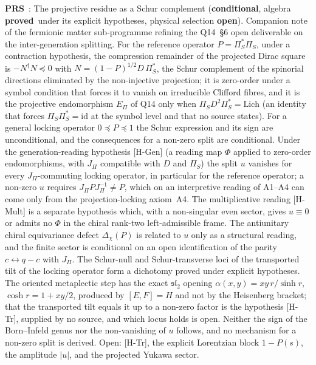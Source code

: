\documentclass[11pt,a4paper]{article}
\newcommand{\sproved}{\textcolor{cproved}{\textbf{proved}}}
\newcommand{\sopen}{\textcolor{copen}{\textbf{open}}}
\newcommand{\scond}{\textcolor{ccond}{\textbf{conditional}}}
\begin{document}
    \textbf{PRS}~\cite{Beau2026prs}: The projective residue as a Schur complement (\scond, algebra \sproved\ under its
    explicit hypotheses, physical selection \sopen).
    Companion note of the fermionic matter sub-programme refining the Q14~\S6 open deliverable on
    the inter-generation splitting.
    For the reference operator $P = \Pi_S^*\Pi_S$, under a contraction hypothesis, the compression remainder of the
    projected Dirac square is $-N^\dagger N \preceq 0$ with $N = (1-P)^{1/2} D\,\Pi_S^*$, the Schur complement of the
    spinorial directions eliminated by the non-injective projection; it is zero-order under a symbol condition that
    forces it to vanish on irreducible Clifford fibres, and it is the projective endomorphism $E_\Pi$ of Q14 only when
    $\Pi_S D^2 \Pi_S^* = \mathrm{Lich}$ (an identity that forces $\Pi_S \Pi_S^* = \mathrm{id}$ at the symbol level and
    that no source states).
    For a general locking operator $0 \preceq P \preceq 1$ the Schur expression and its sign are unconditional, and the
    consequences for a non-zero split are conditional.
    Under the generation-reading hypothesis [H-Gen] (a reading map $\Phi$ applied to zero-order endomorphisms, with
    $J_\Pi$ compatible with $D$ and $\Pi_S$) the split $u$ vanishes for every $J_\Pi$-commuting locking operator, in
    particular for the reference operator; a non-zero $u$ requires $J_\Pi P J_\Pi^{-1} \neq P$, which on an
    interpretive reading of A1--A4 can come only from the projection-locking axiom~A4.
    The multiplicative reading [H-Mult] is a separate hypothesis which, with a non-singular even sector, gives
    $u \equiv 0$ or admits no $\Phi$ in the chiral rank-two left-admissible frame.
    The antiunitary chiral equivariance defect $\Delta_\chi(P)$ is related to $u$ only as a structural reading, and the
    finite sector is conditional on an open identification of the parity $c \leftrightarrow q-c$ with $J_\Pi$.
    The Schur-null and Schur-transverse loci of the transported tilt of the locking operator form a dichotomy proved
    under explicit hypotheses.
    The oriented metaplectic step has the exact $\mathfrak{sl}_2$ opening $\alpha(x,y) = xy\,r/\sinh r$,
    $\cosh r = 1 + xy/2$, produced by $[E,F]=H$ and not by the Heisenberg bracket; that the transported tilt equals it
    up to a non-zero factor is the hypothesis [H-Tr], supplied by no source, and which locus holds is open.
    Neither the sign of the Born--Infeld genus nor the non-vanishing of $u$ follows, and no mechanism for a non-zero
    split is derived.
    Open: [H-Tr], the explicit Lorentzian block $1-P(s)$, the amplitude $|u|$, and the projected Yukawa sector.
\end{document}
